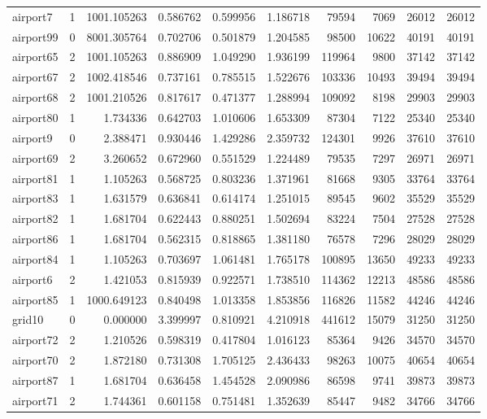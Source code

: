 \documentclass[../../../thesis.tex]{subfiles}
\begin{document}
\begin{longtable}{|l|r|r|r|r|r|r|r|r|r|}
airport7 & 1 & 1001.105263 & 0.586762 & 0.599956 & 1.186718 & 79594 & 7069 & 26012 & 26012 \\
airport99 & 0 & 8001.305764 & 0.702706 & 0.501879 & 1.204585 & 98500 & 10622 & 40191 & 40191 \\
airport65 & 2 & 1001.105263 & 0.886909 & 1.049290 & 1.936199 & 119964 & 9800 & 37142 & 37142 \\
airport67 & 2 & 1002.418546 & 0.737161 & 0.785515 & 1.522676 & 103336 & 10493 & 39494 & 39494 \\
airport68 & 2 & 1001.210526 & 0.817617 & 0.471377 & 1.288994 & 109092 & 8198 & 29903 & 29903 \\
airport80 & 1 & 1.734336 & 0.642703 & 1.010606 & 1.653309 & 87304 & 7122 & 25340 & 25340 \\
airport9 & 0 & 2.388471 & 0.930446 & 1.429286 & 2.359732 & 124301 & 9926 & 37610 & 37610 \\
airport69 & 2 & 3.260652 & 0.672960 & 0.551529 & 1.224489 & 79535 & 7297 & 26971 & 26971 \\
airport81 & 1 & 1.105263 & 0.568725 & 0.803236 & 1.371961 & 81668 & 9305 & 33764 & 33764 \\
airport83 & 1 & 1.631579 & 0.636841 & 0.614174 & 1.251015 & 89545 & 9602 & 35529 & 35529 \\
airport82 & 1 & 1.681704 & 0.622443 & 0.880251 & 1.502694 & 83224 & 7504 & 27528 & 27528 \\
airport86 & 1 & 1.681704 & 0.562315 & 0.818865 & 1.381180 & 76578 & 7296 & 28029 & 28029 \\
airport84 & 1 & 1.105263 & 0.703697 & 1.061481 & 1.765178 & 100895 & 13650 & 49233 & 49233 \\
airport6 & 2 & 1.421053 & 0.815939 & 0.922571 & 1.738510 & 114362 & 12213 & 48586 & 48586 \\
airport85 & 1 & 1000.649123 & 0.840498 & 1.013358 & 1.853856 & 116826 & 11582 & 44246 & 44246 \\
grid10 & 0 & 0.000000 & 3.399997 & 0.810921 & 4.210918 & 441612 & 15079 & 31250 & 31250 \\
airport72 & 2 & 1.210526 & 0.598319 & 0.417804 & 1.016123 & 85364 & 9426 & 34570 & 34570 \\
airport70 & 2 & 1.872180 & 0.731308 & 1.705125 & 2.436433 & 98263 & 10075 & 40654 & 40654 \\
airport87 & 1 & 1.681704 & 0.636458 & 1.454528 & 2.090986 & 86598 & 9741 & 39873 & 39873 \\
airport71 & 2 & 1.744361 & 0.601158 & 0.751481 & 1.352639 & 85447 & 9482 & 34766 & 34766 \\

\end{longtable}
\end{document}
